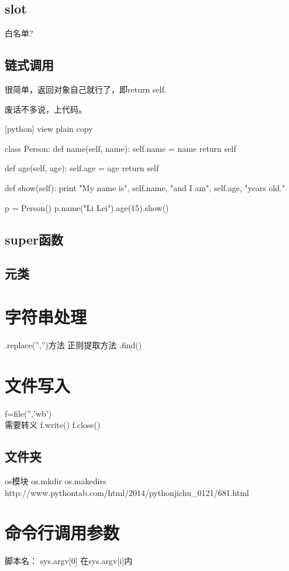 \section{slot}
白名单?
\section{链式调用}
很简单，返回对象自己就行了，即return self.

废话不多说，上代码。

[python] view plain copy

    class Person:  
        def name(self, name):  
            self.name = name  
            return self  
      
        def age(self, age):  
            self.age = age  
            return self  
      
        def show(self):  
            print "My name is", self.name, "and I am", self.age, "years old."  
      
    p = Person()  
    p.name("Li Lei").age(15).show()  
\section{super函数}
\section{元类}
\chapter{字符串处理}
.replace('','')方法
正则提取方法
.find()
\chapter{文件写入}
f=file('','wb')
\\需要转义
f.write()
f.close()
\section{文件夹}
os模块
os.mkdir
os.makedirs
http://www.pythontab.com/html/2014/pythonjichu_0121/681.html
\chapter{命令行调用参数}
脚本名：    sys.argv[0]
在sys.argv[i]内